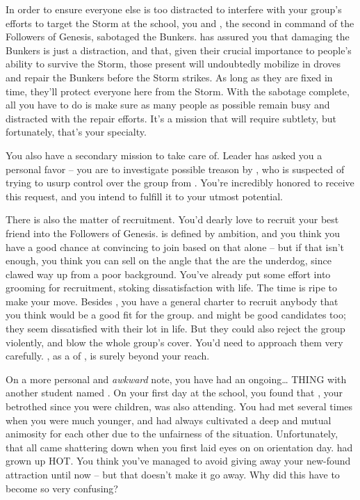 \documentclass[char]{GL2020}
\begin{document}
In order to ensure everyone else is too distracted to interfere with your group's efforts to target the Storm at the school, you and \cChupSecond{\full}, the second in command of the Followers of Genesis, sabotaged the Bunkers. \cChupSecond{} has assured you that damaging the Bunkers is just a distraction, and that, given their crucial importance to people's ability to survive the Storm, those present will undoubtedly mobilize in droves and repair the Bunkers before the Storm strikes. As long as they are fixed in time, they'll protect everyone here from the Storm. With the sabotage complete, all you have to do is make sure as many people as possible remain busy and distracted with the repair efforts. It's a mission that will require subtlety, but fortunately, that's your specialty.
 
You also have a secondary mission to take care of. Leader \cChupLeader{} has asked you a personal favor – you are to investigate possible treason by \cChupSecond{}, who is suspected of trying to usurp control over the group from \cChupLeader{}. You're incredibly honored to receive this request, and you intend to fulfill it to your utmost potential. 
 
There is also the matter of recruitment. You'd dearly love to recruit your best friend \cAmbition{} into the Followers of Genesis. \cAmbition{} is defined by \cAmbition{\their} ambition, and you think you have a good chance at convincing \cAmbition{\them} to join based on that alone -- but if that isn't enough, you think you can sell \cAmbition{\them} on the angle that the \pGoaties{} are the underdog, since \cAmbition{} clawed \cAmbition{\their} way up from a poor background. You've already put some effort into grooming \cAmbition{\them} for recruitment, stoking \cAmbition{\their} dissatisfaction with life. The time is ripe to make your move. Besides \cAmbition{}, you have a general charter to recruit anybody that you think would be a good fit for the group. \cAdopted{} and \cLibAssist{} might be good candidates too; they seem dissatisfied with their lot in life. But they could also reject the group violently, and blow the whole group's cover. You'd need to approach them very carefully. \cDisney{}, as a \cDisney{\cleric} of \cFarmGod{}, is surely beyond your reach.
 
On a more personal and \emph{awkward} note, you have had an ongoing\ldots{} THING with another student named \cHeir{\full}. On your first day at the school, you found that \cHeir{}, your betrothed since you were children, was also attending. You had met several times when you were much younger, and had always cultivated a deep and mutual animosity for each other due to the unfairness of the situation. Unfortunately, that all came shattering down when you first laid eyes on \cHeir{\them} on orientation day. \cHeir{} had grown up HOT. You think you've managed to avoid giving away your new-found attraction until now -- but that doesn't make it go away. Why did this have to become so very confusing?
 
\end{document}
